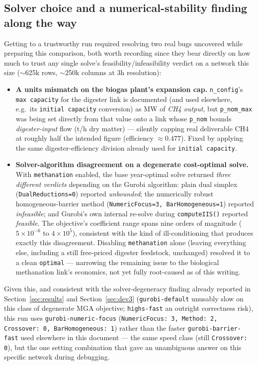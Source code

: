 \documentclass[11pt]{article}
\begin{document}
\subsection{Solver choice and a numerical-stability finding along the way}
\label{sec:decisive-notes}
Getting to a trustworthy run required resolving two real bugs uncovered
while preparing this comparison, both worth recording since they bear
directly on how much to trust any single solve's feasibility/infeasibility
verdict on a network this size ($\sim$625k rows, $\sim$250k columns at 3h
resolution):
\begin{itemize}[leftmargin=1.4em]
  \item \textbf{A units mismatch on the biogas plant's expansion cap.}
    \texttt{n\_config}'s \texttt{max capacity} for the digester link is
    documented (and used elsewhere, e.g.\ its \texttt{initial capacity}
    conversion) as MW of \emph{CH4 output}, but \texttt{p\_nom\_max} was
    being set directly from that value onto a link whose \texttt{p\_nom}
    bounds \emph{digester-input} flow (t/h dry matter) --- silently
    capping real deliverable CH4 at roughly half the intended figure
    (efficiency $\approx 0.477$). Fixed by applying the same
    digester-efficiency division already used for \texttt{initial capacity}.
  \item \textbf{Solver-algorithm disagreement on a degenerate cost-optimal
    solve.} With \texttt{methanation} enabled, the base year-optimal solve
    returned \emph{three different verdicts} depending on the Gurobi
    algorithm: plain dual simplex (\texttt{DualReductions=0}) reported
    \emph{unbounded}; the numerically robust homogeneous-barrier method
    (\texttt{NumericFocus=3, BarHomogeneous=1}) reported \emph{infeasible};
    and Gurobi's own internal re-solve during \texttt{computeIIS()} reported
    \emph{feasible}. The objective's coefficient range spans nine orders of
    magnitude ($5\times10^{-6}$ to $4\times10^{5}$), consistent with the kind
    of ill-conditioning that produces exactly this disagreement. Disabling
    \texttt{methanation} alone (leaving everything else, including a still
    free-priced digester feedstock, unchanged) resolved it to a clean
    \texttt{optimal} --- narrowing the remaining issue to the biological
    methanation link's economics, not yet fully root-caused as of this
    writing.
\end{itemize}
Given this, and consistent with the solver-degeneracy finding already
reported in Section~\ref{sec:results} and Section~\ref{sec:dev3}
(\texttt{gurobi-default} unusably slow on this class of degenerate MGA
objective; \texttt{highs-fast} an outright correctness risk), this run uses
\texttt{gurobi-numeric-focus} (\texttt{NumericFocus: 3, Method: 2,
Crossover: 0, BarHomogeneous: 1}) rather than the faster
\texttt{gurobi-barrier-fast} used elsewhere in this document --- the same
speed class (still \texttt{Crossover: 0}), but the one setting combination
that gave an unambiguous answer on this specific network during debugging.
\end{document}
